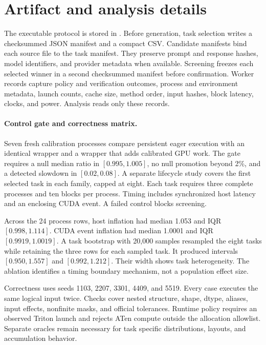 \section{Artifact and analysis details}

The executable protocol is stored in
. Before generation, task
selection writes a checksummed JSON manifest and a compact CSV. Candidate
manifests bind each source file to the task manifest. They preserve prompt and
response hashes, model identifiers, and provider metadata when available.
Screening freezes each selected winner in a second checksummed manifest before
confirmation. Worker records capture policy and verification outcomes, process
and environment metadata, launch counts, cache size, method order, input hashes,
block latency, clocks, and power. Analysis reads only these records.

\paragraph{Control gate and correctness matrix.}

Seven fresh calibration processes compare persistent eager execution with an
identical wrapper and a wrapper that adds calibrated GPU work. The gate requires
a null median ratio in $[0.995,1.005]$, no null promotion beyond 2\%, and a
detected slowdown in $[0.02,0.08]$. A separate lifecycle study covers the first
selected task in each family, capped at eight. Each task requires three complete
processes and ten blocks per process. Timing includes synchronized host latency
and an enclosing CUDA event. A failed control blocks screening.

Across the 24 process rows, host inflation had median 1.053 and IQR
$[0.998,1.114]$. CUDA event inflation had median 1.0001 and IQR
$[0.9919,1.0019]$. A task bootstrap with 20,000 samples resampled the eight tasks while
retaining the three rows for each sampled task. It produced intervals
$[0.950,1.557]$ and $[0.992,1.212]$. Their width shows task heterogeneity. The
ablation identifies a timing boundary mechanism, not a population effect size.

Correctness uses seeds 1103, 2207, 3301, 4409, and 5519. Every case executes the
same logical input twice. Checks cover nested structure, shape, dtype, aliases,
input effects, nonfinite masks, and official tolerances. Runtime policy requires
an observed Triton launch and rejects ATen compute outside the allocation
allowlist. Separate oracles remain necessary for task specific distributions,
layouts, and accumulation behavior.

